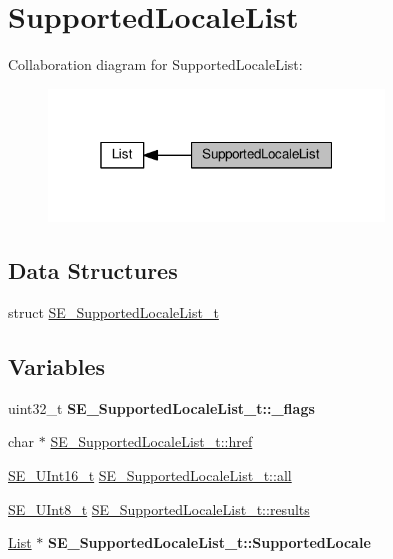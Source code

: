 \hypertarget{group__SupportedLocaleList}{}\section{Supported\+Locale\+List}
\label{group__SupportedLocaleList}
Collaboration diagram for Supported\+Locale\+List\+:\nopagebreak
\begin{figure}[H]
\begin{center}
\leavevmode
\includegraphics[width=253pt]{group__SupportedLocaleList}
\end{center}
\end{figure}
\subsection*{Data Structures}
\begin{DoxyCompactItemize}
\item 
struct \hyperlink{structSE__SupportedLocaleList__t}{S\+E\+\_\+\+Supported\+Locale\+List\+\_\+t}
\end{DoxyCompactItemize}
\subsection*{Variables}
\begin{DoxyCompactItemize}
\item 
\mbox{\label{group__SupportedLocaleList_gab54fb9bf195c50f7d5582b37851f3708}} 
uint32\+\_\+t {\bfseries S\+E\+\_\+\+Supported\+Locale\+List\+\_\+t\+::\+\_\+flags}
\item 
char $\ast$ \hyperlink{group__SupportedLocaleList_ga71abc6b4fb4809aa25326cc667563089}{S\+E\+\_\+\+Supported\+Locale\+List\+\_\+t\+::href}
\item 
\hyperlink{group__UInt16_gac68d541f189538bfd30cfaa712d20d29}{S\+E\+\_\+\+U\+Int16\+\_\+t} \hyperlink{group__SupportedLocaleList_ga6e78274b14e2975edfae1ea26dce27ba}{S\+E\+\_\+\+Supported\+Locale\+List\+\_\+t\+::all}
\item 
\hyperlink{group__UInt8_gaf7c365a1acfe204e3a67c16ed44572f5}{S\+E\+\_\+\+U\+Int8\+\_\+t} \hyperlink{group__SupportedLocaleList_ga158a15d56c70b7f3485e85ee88e2c744}{S\+E\+\_\+\+Supported\+Locale\+List\+\_\+t\+::results}
\item 
\mbox{\label{group__SupportedLocaleList_ga888b49f1bebb869c7f3e370e0ef053f5}} 
\hyperlink{structList}{List} $\ast$ {\bfseries S\+E\+\_\+\+Supported\+Locale\+List\+\_\+t\+::\+Supported\+Locale}
\end{DoxyCompactItemize}


